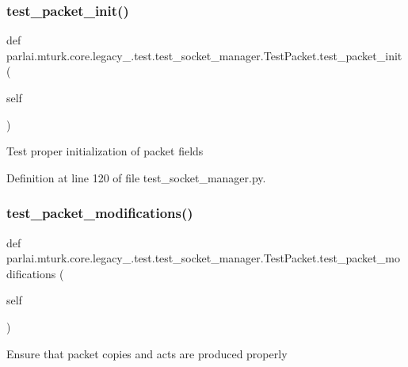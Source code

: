\subsubsection{\texorpdfstring{test\+\_\+packet\+\_\+init()}{test\_packet\_init()}}
{\footnotesize\ttfamily def parlai.\+mturk.\+core.\+legacy\+\_.\+test.\+test\+\_\+socket\+\_\+manager.\+Test\+Packet.\+test\+\_\+packet\+\_\+init (\begin{DoxyParamCaption}\item[{}]{self }\end{DoxyParamCaption})}

\begin{DoxyVerb}Test proper initialization of packet fields\end{DoxyVerb}
 

Definition at line 120 of file test\+\_\+socket\+\_\+manager.\+py.

\mbox{\label{classparlai_1_1mturk_1_1core_1_1legacy__2018_1_1test_1_1test__socket__manager_1_1TestPacket_a6d4934785401ca28058a93ec11b45612}} 
\subsubsection{\texorpdfstring{test\+\_\+packet\+\_\+modifications()}{test\_packet\_modifications()}}
{\footnotesize\ttfamily def parlai.\+mturk.\+core.\+legacy\+\_.\+test.\+test\+\_\+socket\+\_\+manager.\+Test\+Packet.\+test\+\_\+packet\+\_\+modifications (\begin{DoxyParamCaption}\item[{}]{self }\end{DoxyParamCaption})}

\begin{DoxyVerb}Ensure that packet copies and acts are produced properly\end{DoxyVerb}
 

